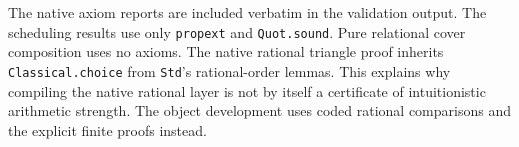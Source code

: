 The native axiom reports are included verbatim in the validation output.
The scheduling results use only \texttt{propext} and \texttt{Quot.sound}.
Pure relational cover composition uses no axioms. The native rational
triangle proof inherits \texttt{Classical.choice} from \texttt{Std}'s
rational-order lemmas. This explains why compiling the native rational
layer is not by itself a certificate of intuitionistic arithmetic
strength. The object development uses coded rational comparisons and
the explicit finite proofs instead.
